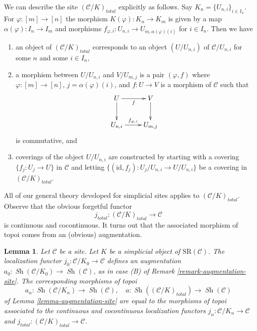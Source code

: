 \documentclass{stacks-project}
\theoremstyle{plain}
\newtheorem{lemma}[subsection]{Lemma}
\theoremstyle{definition}
\theoremstyle{remark}
\numberwithin{equation}{subsection}
\def\Sh{\mathop{\mathit{Sh}}\nolimits}
\begin{document}
\medskip\noindent
We can describe the site $(\mathcal{C}/K)_{total}$ explicitly as follows.
Say $K_n = \{U_{n, i}\}_{i \in I_n}$. For $\varphi : [m] \to [n]$
the morphism $K(\varphi) : K_n \to K_m$ is given by a map
$\alpha(\varphi) : I_n \to I_m$ and morphisms
$f_{\varphi, i} : U_{n, i} \to U_{m, \alpha(\varphi)(i)}$ for $i \in I_n$.
Then we have
\begin{enumerate}
\item an object of $(\mathcal{C}/K)_{total}$
corresponds to an object $(U/U_{n, i})$
of $\mathcal{C}/U_{n, i}$ for some $n$ and some $i \in I_n$,
\item a morphism between $U/U_{n, i}$ and $V/U_{m, j}$
is a pair $(\varphi, f)$ where $\varphi : [m] \to [n]$,
$j = \alpha(\varphi)(i)$, and $f : U \to V$ is a morphism of
$\mathcal{C}$ such that
$$
\vcenter{
\xymatrix{
U \ar[r]_f \ar[d] & V \ar[d] \\
U_{n, i} \ar[r]^-{f_{\varphi, i}} &
U_{m, j}
}
}
$$
is commutative, and
\item coverings of the object $U/U_{n, i}$ are constructed
by starting with a covering $\{f_j : U_j \to U\}$ in $\mathcal{C}$
and letting $\{(\text{id}, f_j) : U_j/U_{n, i} \to U/U_{n, i}\}$
be a covering in $(\mathcal{C}/K)_{total}$.
\end{enumerate}
All of our general theory developed for simplicial sites applies to
$(\mathcal{C}/K)_{total}$. Observe that the obvious forgetful functor
$$
j_{total} : (\mathcal{C}/K)_{total} \longrightarrow \mathcal{C}
$$
is continuous and cocontinuous. It turns out that the associated
morphism of topoi comes from an (obvious) augmentation.

\begin{lemma}
\label{lemma-augmentation-simplicial-semi-representable}
Let $\mathcal{C}$ be a site. Let $K$ be a simplicial object of
$\text{SR}(\mathcal{C})$. The localization functor
$j_0 : \mathcal{C}/K_0 \to \mathcal{C}$ defines an augmentation
$a_0 : \Sh(\mathcal{C}/K_0) \to \Sh(\mathcal{C})$, as in case (B) of
Remark \ref{remark-augmentation-site}.
The corresponding morphisms of topoi
$$
a_n : \Sh(\mathcal{C}/K_n) \longrightarrow \Sh(\mathcal{C}),\quad
a : \Sh((\mathcal{C}/K)_{total}) \longrightarrow \Sh(\mathcal{C})
$$
of Lemma \ref{lemma-augmentation-site}
are equal to the morphisms of topoi associated to the
continuous and cocontinuous localization functors
$j_n : \mathcal{C}/K_n \to \mathcal{C}$ and
$j_{total} : (\mathcal{C}/K)_{total} \to \mathcal{C}$.
\end{lemma}
\end{document}
